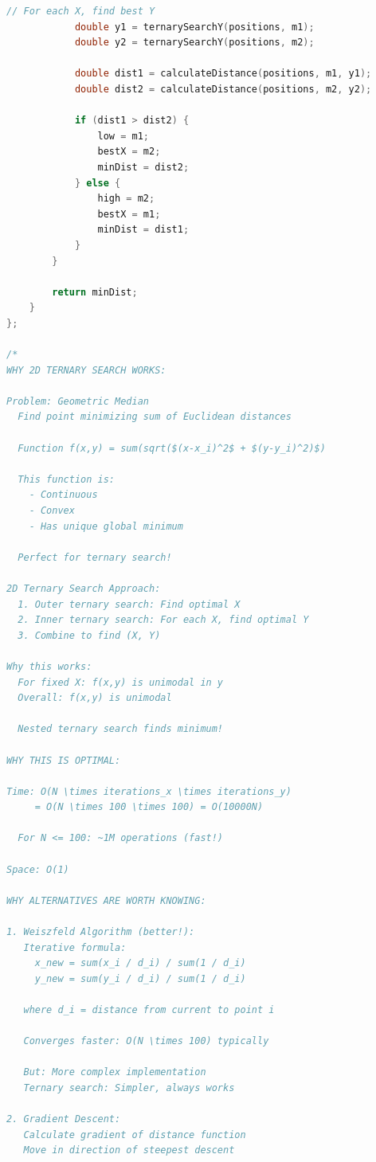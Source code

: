 \documentclass[11pt,a4paper,oneside]{book}
\begin{document}
\begin{lstlisting}[language=C++, caption=Complete Geometric Solutions - NEW PROBLEMS]
            // For each X, find best Y
            double y1 = ternarySearchY(positions, m1);
            double y2 = ternarySearchY(positions, m2);
            
            double dist1 = calculateDistance(positions, m1, y1);
            double dist2 = calculateDistance(positions, m2, y2);
            
            if (dist1 > dist2) {
                low = m1;
                bestX = m2;
                minDist = dist2;
            } else {
                high = m2;
                bestX = m1;
                minDist = dist1;
            }
        }
        
        return minDist;
    }
};

/*
WHY 2D TERNARY SEARCH WORKS:

Problem: Geometric Median
  Find point minimizing sum of Euclidean distances
  
  Function f(x,y) = sum(sqrt($(x-x_i)^2$ + $(y-y_i)^2)$)
  
  This function is:
    - Continuous
    - Convex
    - Has unique global minimum
  
  Perfect for ternary search!

2D Ternary Search Approach:
  1. Outer ternary search: Find optimal X
  2. Inner ternary search: For each X, find optimal Y
  3. Combine to find (X, Y)

Why this works:
  For fixed X: f(x,y) is unimodal in y
  Overall: f(x,y) is unimodal
  
  Nested ternary search finds minimum!

WHY THIS IS OPTIMAL:

Time: O(N \times iterations_x \times iterations_y)
     = O(N \times 100 \times 100) = O(10000N)
  
  For N <= 100: ~1M operations (fast!)

Space: O(1)

WHY ALTERNATIVES ARE WORTH KNOWING:

1. Weiszfeld Algorithm (better!):
   Iterative formula:
     x_new = sum(x_i / d_i) / sum(1 / d_i)
     y_new = sum(y_i / d_i) / sum(1 / d_i)
   
   where d_i = distance from current to point i
   
   Converges faster: O(N \times 100) typically
   
   But: More complex implementation
   Ternary search: Simpler, always works

2. Gradient Descent:
   Calculate gradient of distance function
   Move in direction of steepest descent
   

\end{lstlisting}
\end{document}
